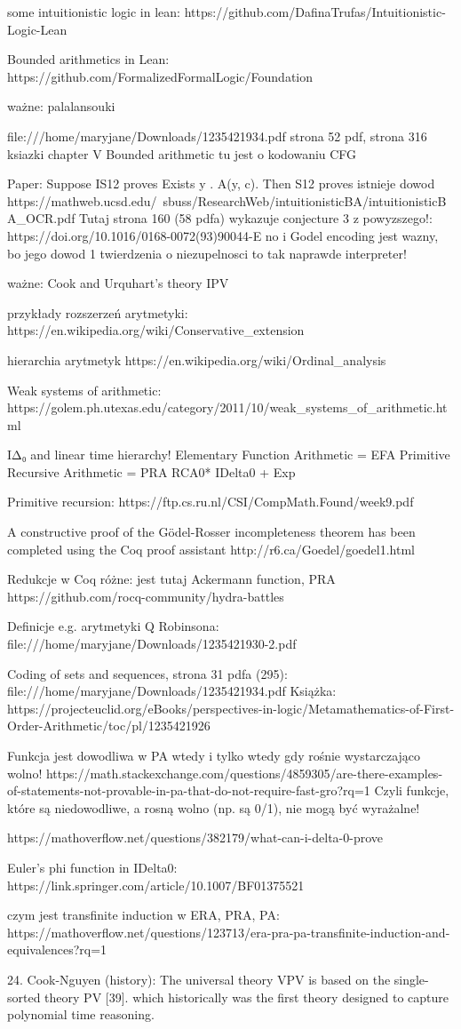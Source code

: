 some intuitionistic logic in lean:
https://github.com/DafinaTrufas/Intuitionistic-Logic-Lean

Bounded arithmetics in Lean:
https://github.com/FormalizedFormalLogic/Foundation

ważne: palalansouki


file:///home/maryjane/Downloads/1235421934.pdf
strona 52 pdf, strona 316 ksiazki
chapter V Bounded arithmetic
tu jest o kodowaniu CFG

Paper:
Suppose IS12 proves Exists y . A(y, c).
Then S12 proves istnieje dowod
https://mathweb.ucsd.edu/~sbuss/ResearchWeb/intuitionisticBA/intuitionisticBA_OCR.pdf
Tutaj strona 160 (58 pdfa) wykazuje conjecture 3 z powyzszego!:
https://doi.org/10.1016/0168-0072(93)90044-E
no i Godel encoding jest wazny, bo jego dowod 1 twierdzenia o niezupelnosci
to tak naprawde interpreter!

ważne: Cook and Urquhart's theory IPV

przykłady rozszerzeń arytmetyki:
https://en.wikipedia.org/wiki/Conservative_extension

hierarchia arytmetyk
https://en.wikipedia.org/wiki/Ordinal_analysis

Weak systems of arithmetic:
https://golem.ph.utexas.edu/category/2011/10/weak_systems_of_arithmetic.html

IΔ₀ and linear time hierarchy!
Elementary Function Arithmetic = EFA
Primitive Recursive Arithmetic = PRA
RCA0*
IDelta0 + Exp

Primitive recursion:
https://ftp.cs.ru.nl/CSI/CompMath.Found/week9.pdf

A constructive proof of the Gödel-Rosser incompleteness theorem has been completed using the Coq proof assistant
http://r6.ca/Goedel/goedel1.html

Redukcje w Coq różne:  jest tutaj Ackermann function, PRA
https://github.com/rocq-community/hydra-battles

Definicje e.g. arytmetyki Q Robinsona:
file:///home/maryjane/Downloads/1235421930-2.pdf

Coding of sets and sequences, strona 31 pdfa (295):
file:///home/maryjane/Downloads/1235421934.pdf
Książka:
https://projecteuclid.org/eBooks/perspectives-in-logic/Metamathematics-of-First-Order-Arithmetic/toc/pl/1235421926

Funkcja jest dowodliwa w PA wtedy i tylko wtedy gdy rośnie wystarczająco wolno!
https://math.stackexchange.com/questions/4859305/are-there-examples-of-statements-not-provable-in-pa-that-do-not-require-fast-gro?rq=1
Czyli funkcje, które są niedowodliwe, a rosną wolno (np. są 0/1), nie mogą być wyrażalne!

https://mathoverflow.net/questions/382179/what-can-i-delta-0-prove

Euler's phi function in IDelta0:
https://link.springer.com/article/10.1007/BF01375521

czym jest transfinite induction w ERA, PRA, PA:
https://mathoverflow.net/questions/123713/era-pra-pa-transfinite-induction-and-equivalences?rq=1


24. Cook-Nguyen (history):
The universal theory VPV is based on the single-sorted theory PV [39].
which historically was the first theory designed to capture polynomial time
reasoning. 

